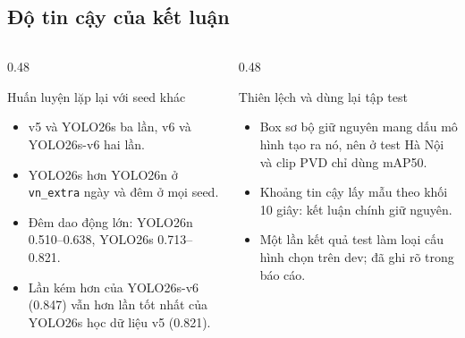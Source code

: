 \documentclass[aspectratio=\mlwAspectRatio, \mlwBaseSize, t]{beamer}
\begin{document}
\subsection{Độ tin cậy của kết luận}
\begin{frame}{\stitle}
  \begin{columns}[T]
    \begin{column}{0.48\textwidth}
      \begin{block}{Huấn luyện lặp lại với seed khác}
        \begin{itemize}
          \item v5 và YOLO26s ba lần, v6 và YOLO26s-v6 hai lần.
          \item YOLO26s hơn YOLO26n ở \texttt{vn\_extra} ngày và đêm \alert{ở mọi seed}.
          \item Đêm dao động lớn: YOLO26n 0.510--0.638, YOLO26s 0.713--0.821.
          \item Lần kém hơn của YOLO26s-v6 (0.847) vẫn hơn lần tốt nhất của YOLO26s học dữ liệu v5 (0.821).
        \end{itemize}
      \end{block}
    \end{column}
    \begin{column}{0.48\textwidth}
      \begin{block}{Thiên lệch và dùng lại tập test}
        \begin{itemize}
          \item Box sơ bộ giữ nguyên mang dấu mô hình tạo ra nó, nên ở test Hà Nội và clip PVD chỉ dùng mAP50.
          \item Khoảng tin cậy lấy mẫu theo khối 10 giây: kết luận chính giữ nguyên.
          \item Một lần kết quả test làm loại cấu hình chọn trên dev; đã ghi rõ trong báo cáo.
        \end{itemize}
      \end{block}
    \end{column}
  \end{columns}
\end{frame}
\end{document}
